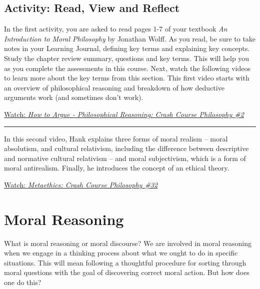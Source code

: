\documentclass[
]{book}
\begin{document}
\hypertarget{activity-read-view-and-reflect}{%
\subsection*{Activity: Read, View and Reflect}\label{activity-read-view-and-reflect}}

\begin{reflect}
In the first activity, you are asked to read pages 1-7 of your textbook \emph{An Introduction to Moral Philosophy} by Jonathan Wolff. As you read, be sure to take notes in your Learning Journal, defining key terms and explaining key concepts. Study the chapter review summary, questions and key terms. This will help you as you complete the assessments in this course.
Next, watch the following videos to learn more about the key terms from this section. This first video starts with an overview of philosophical reasoning and breakdown of how deductive arguments work (and sometimes don't work).

\href{https://www.youtube.com/watch?v=NKEhdsnKKHs}{Watch: \emph{How to Argue - Philosophical Reasoning: Crash Course Philosophy \#2}}

\begin{center}\rule{0.5\linewidth}{0.5pt}\end{center}

In this second video, Hank explains three forms of moral realism -- moral absolutism, and cultural relativism, including the difference between descriptive and normative cultural relativism -- and moral subjectivism, which is a form of moral antirealism. Finally, he introduces the concept of an ethical theory.

\href{https://www.youtube.com/watch?v=FOoffXFpAlU}{Watch: \emph{Metaethics: Crash Course Philosophy \#32}}
\end{reflect}

\hypertarget{moral-reasoning}{%
\section{Moral Reasoning}\label{moral-reasoning}}

What is moral reasoning or moral discourse? We are involved in moral reasoning when we engage in a thinking process about what we ought to do in specific situations. This will mean following a thoughtful procedure for sorting through moral questions with the goal of discovering correct moral action. But how does one do this?
\end{document}
